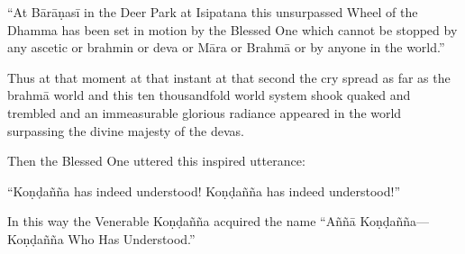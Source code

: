 \begin{english-only-hang}
  ``At Bārāṇasī in the Deer Park at Isipatana this unsurpassed Wheel of the Dhamma has been set in motion by the Blessed One which cannot be stopped by any ascetic or brahmin or deva or Māra or Brahmā or by anyone in the world.''
\end{english-only-hang}

\begin{english-only-hang}
  Thus at that moment at that instant at that second the cry spread as far as the brahmā world and this ten thousandfold world system shook quaked and trembled and an immeasurable glorious radiance appeared in the world surpassing the divine majesty of the devas.
\end{english-only-hang}

\begin{english-only-hang}
  Then the Blessed One uttered this inspired utterance:
\end{english-only-hang}

\begin{english-only-hang}
  ``Koṇḍañña has indeed understood! Koṇḍañña has indeed understood!''
\end{english-only-hang}

\begin{english-only-hang}
  In this way the Venerable Koṇḍañña acquired the name ``Aññā Koṇḍañña—Koṇḍañña Who Has Understood.''
\end{english-only-hang}

\suttaRef{[SN 56.11]}
